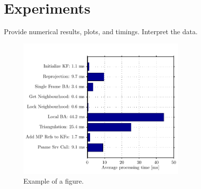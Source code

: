 \chapter{Experiments}\label{chap:experiments}

Provide numerical results, plots, and timings. Interpret the data.

\begin{figure}[h]
   \centering
   \includegraphics[width=0.75\textwidth]{img/processing_time.pdf}
   \caption{Example of a figure.}
   \label{img:timing}
\end{figure}